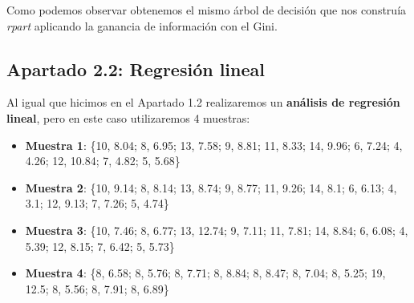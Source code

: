 \documentclass [a4paper] {article}
\begin{document}
Como podemos observar obtenemos el mismo árbol de decisión que nos construía \textit{rpart} aplicando la ganancia de información con el Gini.

\newpage

\subsection{Apartado 2.2: Regresión lineal}
Al igual que hicimos en el Apartado 1.2 realizaremos un \textbf{análisis de regresión lineal}, pero en este caso utilizaremos 4 muestras:
\begin{center}
	\begin{itemize}
		\item \textbf{Muestra 1}: \{10, 8.04; 8, 6.95; 13, 7.58; 9, 8.81; 11, 8.33; 14, 9.96; 6, 7.24; 4, 4.26; 12, 10.84; 7, 4.82; 5, 5.68\}
		\item \textbf{Muestra 2}: \{10, 9.14; 8, 8.14; 13, 8.74; 9, 8.77; 11, 9.26; 14, 8.1; 6, 6.13; 4, 3.1; 12, 9.13; 7, 7.26; 5, 4.74\}
		\item \textbf{Muestra 3}: \{10, 7.46; 8, 6.77; 13, 12.74; 9, 7.11; 11, 7.81; 14, 8.84; 6, 6.08; 4, 5.39; 12, 8.15; 7, 6.42; 5, 5.73\}
		\item \textbf{Muestra 4}: \{8, 6.58; 8, 5.76; 8, 7.71; 8, 8.84; 8, 8.47; 8, 7.04; 8, 5.25; 19, 12.5; 8, 5.56; 8, 7.91; 8, 6.89\}
	\end{itemize}
\end{center}
\end{document}
